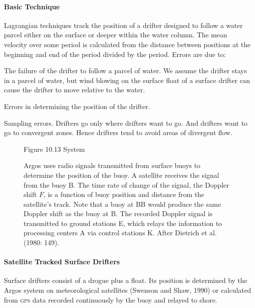 \paragraph{Basic Technique}
Lagrangian techniques track the position of a drifter designed to
follow a water parcel either on the surface or deeper within the water
column. The mean velocity over some period is calculated from the
distance between positions at the beginning and end of the period
divided by the period. Errors are due to:
\begin{enumerate}
\vitem The failure of the drifter to follow a parcel of water. We
assume the drifter stays in a parcel of water, but wind blowing on the
surface float of a surface drifter can cause the drifter to move
relative to the water.

\vitem Errors in determining the position of the drifter.

\vitem Sampling errors. Drifters go only where
drifters want to
go. And drifters want to go to convergent zones. Hence drifters tend
to avoid areas of divergent flow.
\end{enumerate}

\begin{figure}[t!]
\footnotesize
Figure 10.13 System\rule{0mm}{4ex} Argos uses
radio signals transmitted from surface buoys to determine the position
of the buoy. A satellite receives the signal from the buoy B. The time
rate of change of the signal, the Doppler shift $F$, is a function of
buoy position and distance from the satellite's track. Note that a
buoy at BB would produce the same Doppler shift as the buoy at B. The
recorded Doppler signal is transmitted to ground stations E, which
relays the information to processing centers A via control stations
K. After Dietrich et al. (1980: 149).
\label{fig:argos}
\vspace{-4ex}
\end{figure}

\paragraph{Satellite Tracked Surface Drifters}
Surface drifters consist of a drogue plus a
float. Its position is determined by the Argos
system on meteorological satellites (Swenson and Shaw, 1990) or
calculated from \textsc{gps} data recorded continuously by the buoy
and relayed to shore.

